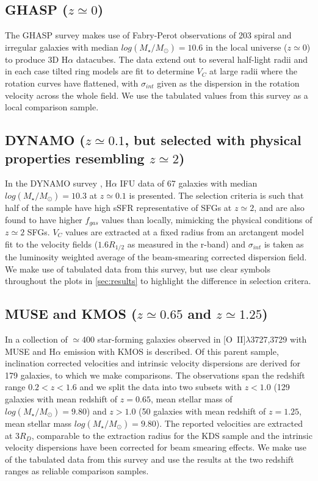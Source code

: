\documentclass[fleqn,usenatbib]{mn2e}
\begin{document}
\subsection{GHASP ($z\simeq0$)}\label{subsec:GHASP}
The GHASP survey \citep[E08]{Epinat2008,Epinat2008a} makes use of Fabry-Perot observations of 203 spiral and irregular galaxies with median $log(M_{\star}/M_{\odot})=10.6$ in the local universe ($z\simeq0$) to produce 3D H$\alpha$ datacubes.
The data extend out to several half-light radii and in each case tilted ring models are fit to determine $V_{C}$ at large radii where the rotation curves have flattened, with $\sigma_{int}$ given as the dispersion in the rotation velocity across the whole field.
We use the tabulated values from this survey as a local comparison sample.

\subsection{DYNAMO ($z\simeq0.1$, but selected with physical properties resembling $z\simeq2$)}\label{subsec:DYNAMO}
In the DYNAMO survey \citep[G14]{Green2014}, H$\alpha$ IFU data of 67 galaxies with median $log(M_{\star}/M_{\odot})=10.3$ at $z\simeq0.1$ is presented.
The selection criteria is such that half of the sample have high sSFR representative of SFGs at $z\simeq2$, and are also found to have higher $f_{gas}$ values than locally, mimicking the physical conditions of $z\simeq2$ SFGs.
$V_{C}$ values are extracted at a fixed radius from an arctangent model fit to the velocity fields ($1.6R_{1/2}$ as measured in the r-band) and $\sigma_{int}$ is taken as the luminosity weighted average of the beam-smearing corrected dispersion field.
We make use of tabulated data from this survey, but use clear symbols throughout the plots in \cref{sec:results} to highlight the difference in selection critera.

\subsection{MUSE and KMOS ($z\simeq0.65$ and $z\simeq1.25$)}\label{subsec:MUSE_and_KMOS}
In \cite{Swinbank2017} a collection of $\simeq400$ star-forming galaxies observed in [O~{\sc II}]$\lambda$3727,3729 with MUSE and H$\alpha$ emission with KMOS is described.
Of this parent sample, inclination corrected velocities and intrinsic velocity dispersions are derived for 179 galaxies, to which we make comparisons.
The observations span the redshift range $0.2 < z < 1.6$ and we split the data into two subsets with $z < 1.0$ (129 galaxies with mean redshift of $z = 0.65$, mean stellar mass of $log(M_{\star}/M_{\odot})=9.80$) and $z > 1.0$ (50 galaxies with mean redshift of $z = 1.25$, mean stellar mass $log(M_{\star}/M_{\odot})=9.80$).
The reported velocities are extracted at $3R_{D}$, comparable to the extraction radius for the KDS sample and the intrinsic velocity dispersions have been corrected for beam smearing effects.
We make use of the tabulated data from this survey and use the results at the two redshift ranges as reliable comparison samples.
\end{document}
